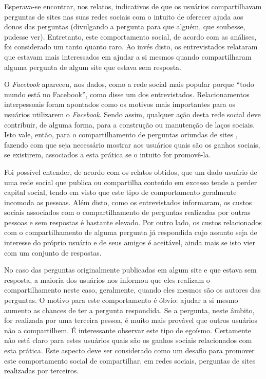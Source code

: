 Esperava-se encontrar, nos relatos, indicativos de que os usuários compartilhavam perguntas de sites \qa nas suas redes sociais com o intuito de oferecer ajuda aos donos das perguntas (divulgando a pergunta para que alguém, que soubesse, pudesse ver). Entretanto, este comportamento social, de acordo com as análises, foi considerado um tanto quanto raro. Ao invés disto, os entrevistados relataram que estavam mais interessados em ajudar a si mesmos quando compartilharam alguma pergunta de algum site \qa que estava sem resposta.

O \textit{Facebook} apareceu, nos dados, como a rede social mais popular porque ``todo mundo está no Facebook'', como disse um dos entrevistados. Relacionamentos interpessoais foram apontados como os motivos mais importantes para os usuários utilizarem o \textit{Facebook}. Sendo assim, qualquer ação desta rede social deve contribuir, de alguma forma, para a construção ou manutenção de laços sociais. Isto vale, então, para o compartilhamento de perguntas oriundas de sites \qa, fazendo com que seja necessário mostrar aos usuários quais são os ganhos sociais, se existirem, associados a esta prática se o intuito for promovê-la. 

Foi possível entender, de acordo com os relatos obtidos, que um dado usuário de uma rede social que publica ou compartilha conteúdo em excesso tende a perder capital social, tendo em visto que este tipo de comportamento geralmente incomoda as pessoas. Além disto, como os entrevistados informaram, os custos sociais associados com o compartilhamento de perguntas realizadas por outras pessoas e sem respostas é bastante elevado. Por outro lado, os custos relacionados com o compartilhamento de alguma pergunta já respondida cujo assunto seja de interesse do próprio usuário e de seus amigos é aceitável, ainda mais se isto vier com um conjunto de respostas.

No caso das perguntas originalmente publicadas em algum site \qa e que estava sem resposta, a maioria dos usuários nos informou que eles realizam o compartilhamento neste caso, geralmente, quando eles mesmos são os autores das perguntas. O motivo para este comportamento é óbvio: ajudar a si mesmo aumento as chances de ter a pergunta respondida. Se a pergunta, neste âmbito, for realizada por uma terceira pessoa, é muito mais provável que outros usuários não a compartilhem. É interessante observar este tipo de egoísmo. Certamente não está claro para estes usuários quais são os ganhos sociais relacionados com esta prática. Este aspecto deve ser considerado como um desafio para promover este comportamento social de compartilhar, em redes sociais, perguntas de sites \qa realizadas por terceiros.

